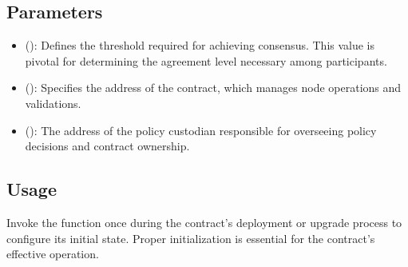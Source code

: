 \documentclass[a4paper,10pt,english]{sphinxmanual}
\begin{document}
\begin{sphinxVerbatim}[commandchars=\\\{\}]
\end{sphinxVerbatim}


\subsection{Parameters}
\label{\detokenize{docs_consensus_mechanism_contract:parameters}}\begin{itemize}
\item {} 
\sphinxAtStartPar
{} ():
Defines the threshold required for achieving consensus. This value is pivotal for determining the agreement level necessary among participants.

\item {} 
\sphinxAtStartPar
{} ():
Specifies the address of the  contract, which manages node operations and validations.

\item {} 
\sphinxAtStartPar
{} ():
The address of the policy custodian responsible for overseeing policy decisions and contract ownership.

\end{itemize}


\subsection{Usage}
\label{\detokenize{docs_consensus_mechanism_contract:usage}}
\sphinxAtStartPar
Invoke the  function once during the contract’s deployment or upgrade process to configure its initial state. Proper initialization is essential for the contract’s effective operation.
\end{document}
